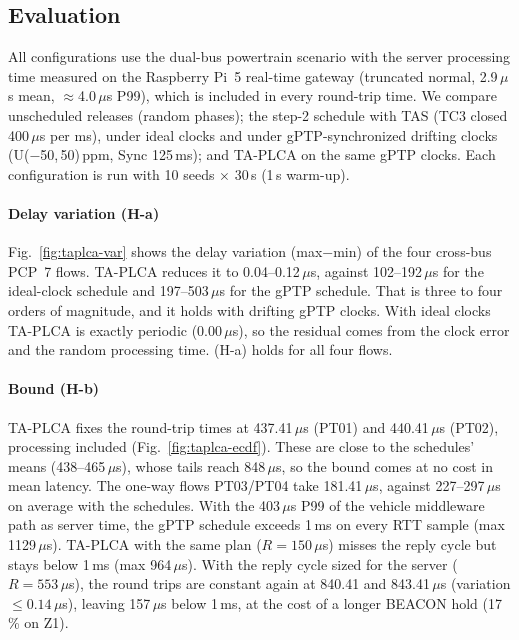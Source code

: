 \subsection{Evaluation}
All configurations use the dual-bus powertrain scenario with the server processing time measured on
the Raspberry Pi~5 real-time gateway (truncated normal, 2.9\,$\mu$s mean,
$\approx$4.0\,$\mu$s P99), which is included in every round-trip time. We compare
unscheduled releases (random phases); the step-2 schedule with TAS (TC3 closed
400\,$\mu$s per ms), under ideal clocks and under gPTP-synchronized drifting clocks
(U($-$50,\,50)\,ppm, Sync 125\,ms); and TA-PLCA on the same gPTP clocks.
Each configuration is run with 10 seeds $\times$ 30\,s (1\,s warm-up).

\paragraph{Delay variation (H-a)}
Fig.~\ref{fig:taplca-var} shows the delay variation (max$-$min) of the four cross-bus
PCP~7 flows. TA-PLCA reduces it to 0.04--0.12\,$\mu$s, against 102--192\,$\mu$s for the
ideal-clock schedule and 197--503\,$\mu$s for the gPTP schedule. That is three to four
orders of magnitude, and it holds with drifting gPTP clocks. With ideal clocks TA-PLCA
is exactly periodic (0.00\,$\mu$s), so the residual comes from the clock error and the
random processing time. (H-a) holds for all four flows.

\paragraph{Bound (H-b)}
TA-PLCA fixes the round-trip times at 437.41\,$\mu$s (PT01) and 440.41\,$\mu$s (PT02),
processing included (Fig.~\ref{fig:taplca-ecdf}). These are close to the schedules' means
(438--465\,$\mu$s), whose tails reach 848\,$\mu$s, so the bound comes at no cost in mean
latency. The one-way flows PT03/PT04 take 181.41\,$\mu$s, against 227--297\,$\mu$s on
average with the schedules. With the 403\,$\mu$s P99 of the vehicle middleware path as
server time, the gPTP schedule exceeds 1\,ms on every RTT sample (max 1129\,$\mu$s). TA-PLCA
with the same plan ($R = 150\,\mu$s) misses the reply cycle but stays below 1\,ms (max
964\,$\mu$s). With the reply cycle sized for the server ($R = 553\,\mu$s), the round trips are
constant again at 840.41 and 843.41\,$\mu$s (variation $\leq 0.14\,\mu$s), leaving 157\,$\mu$s
below 1\,ms, at the cost of a longer BEACON hold (17\,\% on Z1).

